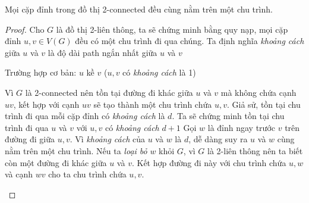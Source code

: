 \begin{corollary}
    Mọi cặp đỉnh trong đồ thị 2-connected đều cùng nằm trên một chu trình.
    \begin{proof}
        Cho $G$ là đồ thị 2-liên thông, ta sẽ chứng minh bằng quy nạp, mọi cặp đỉnh $u,v \in V(G)$ đều có một chu trình đi qua chúng.
        Ta định nghĩa \textit{khoảng cách} giữa $u$ và $v$ là độ dài path ngắn nhất giữa $u$ và $v$

        Trường hợp cơ bản: $u$ kề $v$ ($u,v$ có \textit{khoảng cách} là 1)
        \begin{center}
        \end{center}
        Vì $G$ là 2-connected nên tồn tại đường đi khác giữa $u$ và $v$ mà không chứa cạnh $uv$, kết hợp với cạnh $uv$ sẽ tạo thành một chu trình chứa $u,v$.
        \indent Giả sử, tồn tại chu trình đi qua mỗi cặp đỉnh có \textit{khoảng cách} là $d$. Ta sẽ chứng minh tồn tại chu trình đi qua $u$ và $v$ với $u,v$ có \textit{khoảng cách} $d+1$
        Gọi $w$ là đỉnh ngay trước $v$ trên đường đi giữa $u,v$. Vì \textit{khoảng cách} của $u$ và $w$ là $d$, dễ dàng suy ra $u$ và $w$ cùng nằm trên một chu trình.
        Nếu ta \textit{loại bỏ} $w$ khỏi $G$, vì $G$ là 2-liên thông nên ta biết còn một đường đi khác giữa $u$ và $v$. Kết hợp đường đi này với chu trình chứa $u,w$ và cạnh $wv$ cho ta chu trình chứa $u,v$.

        \begin{center}
\end{center}
\end{proof}
\end{corollary}
